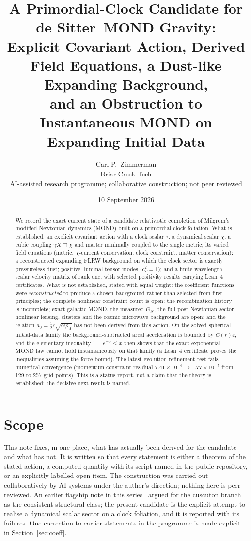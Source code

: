 \documentclass[11pt,letterpaper]{article}
\title{A Primordial-Clock Candidate for de Sitter--MOND Gravity:\\ Explicit Covariant Action, Derived Field Equations, a Dust-like Expanding Background,\\ and an Obstruction to Instantaneous MOND on Expanding Initial Data}
\author{Carl P.\ Zimmerman\\ \small Briar Creek Tech\\ \small AI-assisted research programme; collaborative construction; not peer reviewed}
\date{10 September 2026}
\begin{document}
\maketitle

\begin{abstract}
We record the exact current state of a candidate relativistic completion of Milgrom's modified Newtonian dynamics (MOND) built on a primordial-clock foliation. What is established: an explicit covariant action with a clock scalar $\tau$, a dynamical scalar $\chi$, a cubic coupling $\gamma X\Box\chi$ and matter minimally coupled to the single metric; its varied field equations (metric, $\chi$-current conservation, clock constraint, matter conservation); a reconstructed expanding FLRW background on which the clock sector is exactly pressureless dust; positive, luminal tensor modes ($c_T^2=1$); and a finite-wavelength scalar velocity matrix of rank one, with selected positivity results carrying Lean~4 certificates. What is not established, stated with equal weight: the coefficient functions were \emph{reconstructed} to produce a chosen background rather than selected from first principles; the complete nonlinear constraint count is open; the recombination history is incomplete; exact galactic MOND, the measured $G_N$, the full post-Newtonian sector, nonlinear lensing, clusters and the cosmic microwave background are open; and the relation $a_0=\tfrac12 c\sqrt{G\rho_\Lambda}$ has not been derived from this action. On the solved spherical initial-data family the background-subtracted areal acceleration is bounded by $C(r)\varepsilon$, and the elementary inequality $1-e^{-x}\le x$ then shows that the exact exponential MOND law cannot hold instantaneously on that family (a Lean~4 certificate proves the inequalities assuming the force bound). The latest evolution-refinement test fails numerical convergence (momentum-constraint residual $7.41\times10^{-6}\to1.77\times10^{-5}$ from 129 to 257 grid points). This is a status report, not a claim that the theory is established; the decisive next result is named.
\end{abstract}

\section{Scope}
This note fixes, in one place, what has actually been derived for the candidate and what has not. It is written so that every statement is either a theorem of the stated action, a computed quantity with its script named in the public repository, or an explicitly labelled open item. The construction was carried out collaboratively by AI systems under the author's direction; nothing here is peer reviewed. An earlier flagship note in this series~\cite{paper12} argued for the cuscuton branch as the consistent structural class; the present candidate is the explicit attempt to realise a dynamical scalar sector on a clock foliation, and it is reported with its failures. One correction to earlier statements in the programme is made explicit in Section~\ref{sec:coeff}.
\end{document}
